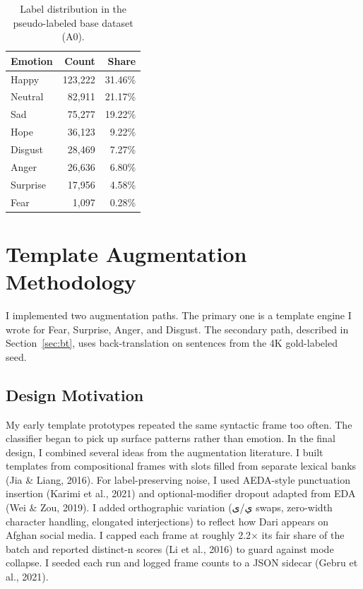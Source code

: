 \documentclass[11pt,a4paper]{article}
\begin{document}
\begin{table}[H]
\centering
\caption{Label distribution in the pseudo-labeled base dataset (A0).}
\label{tab:label_dist}
\begin{tabular}{@{}lrr@{}}
\toprule
Emotion & Count & Share \\
\midrule
Happy    & 123,222 & 31.46\% \\
Neutral  &  82,911 & 21.17\% \\
Sad      &  75,277 & 19.22\% \\
Hope     &  36,123 &  9.22\% \\
Disgust  &  28,469 &  7.27\% \\
Anger    &  26,636 &  6.80\% \\
Surprise &  17,956 &  4.58\% \\
\rowcolor{red!15}
Fear     &   1,097 &  0.28\% \\
\bottomrule
\end{tabular}
\end{table}

\section{Template Augmentation Methodology}
\label{sec:templates}

I implemented two augmentation paths. The primary one is a template engine I wrote for Fear, Surprise, Anger, and Disgust. The secondary path, described in Section~\ref{sec:bt}, uses back-translation on sentences from the 4K gold-labeled seed.

\subsection{Design Motivation}

My early template prototypes repeated the same syntactic frame too often. The classifier began to pick up surface patterns rather than emotion. In the final design, I combined several ideas from the augmentation literature. I built templates from compositional frames with slots filled from separate lexical banks (Jia \& Liang, 2016). For label-preserving noise, I used AEDA-style punctuation insertion (Karimi et al., 2021) and optional-modifier dropout adapted from EDA (Wei \& Zou, 2019). I added orthographic variation (ي/ی swaps, zero-width character handling, elongated interjections) to reflect how Dari appears on Afghan social media. I capped each frame at roughly 2.2$\times$ its fair share of the batch and reported distinct-n scores (Li et al., 2016) to guard against mode collapse. I seeded each run and logged frame counts to a JSON sidecar (Gebru et al., 2021).
\end{document}
